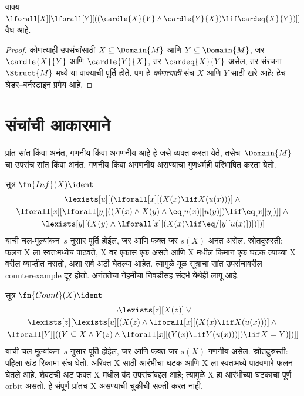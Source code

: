 \begin{prop}
वाक्य $\lforall[X][\lforall[Y][((\cardle{X}{Y} \land
    \cardle{Y}{X}) \lif \cardeq{X}{Y})]]$ वैध आहे.
\end{prop}

\begin{proof}
कोणत्याही उपसंचांसाठी $X \subseteq \Domain{M}$
आणि $Y \subseteq \Domain{M}$, जर
$\cardle{X}{Y}$ आणि $\cardle{Y}{X}$, तर
$\cardeq{X}{Y}$ असेल, तर संरचना~$\Struct{M}$
मध्ये या वाक्याची पूर्ति होते. पण हे
\emph{कोणत्याही} संच $X$ आणि $Y$ साठी खरे आहे:
हेच श्रेडर--बर्नस्टाइन प्रमेय आहे.
\end{proof}













\section{संचांची आकारमाने}\label{sol:set:crd:sec}

\begin{explain}
प्रांत सांत किंवा अनंत, गणनीय किंवा
अगणनीय आहे हे जसे व्यक्त करता येते,
तसेच~$\Domain{M}$ चा उपसंच सांत किंवा अनंत,
गणनीय किंवा अगणनीय असण्याचा
गुणधर्मही परिभाषित करता येतो.
\end{explain}

\begin{prop}

सूत्र $\fn{Inf}(X) \ident$
\begin{multline*}
\lexists[u][(\lforall[x][(X(x) \lif X(u(x)))] \land {} \\
\lforall[x][\lforall[y][((X(x) \land X(y) \land \eq[u(x)][u(y)]) \lif
      \eq[x][y])]] \land {} \\
\lexists[y][(X(y) \land \lforall[x][(X(x) \lif \eq/[y][u(x)])])])]
\end{multline*}
याची चल-मूल्यांकन~$s$ नुसार पूर्ति होईल, जर आणि
फक्त जर $s(X)$ अनंत असेल. स्रोतदुरुस्ती: फलन
X ला स्वतःमध्येच पाठवते, X वर एकास एक असते आणि X मधील
किमान एक घटक त्याच्या X वरील व्याप्तीत नसतो, अशा सर्व अटी
घेतल्या आहेत. त्यामुळे मूळ सूत्राचा सांत उपसंचावरील counterexample
दूर होतो. अनंततेचा नेहमीचा निवडीसह संदर्भ येथेही लागू आहे.
\end{prop}

\begin{prop}
सूत्र $\fn{Count}(X) \ident $
\begin{multline*}
\lnot\lexists[z][X(z)] \lor {} \\
\lexists[z][\lexists[u][(X(z) \land
    \lforall[x][(X(x) \lif X(u(x)))] \land {} \\
\lforall[Y][((Y \subseteq X \land Y(z) \land
      \lforall[x][(Y(x) \lif Y(u(x)))]) \lif X = Y)])]]
\end{multline*}
याची चल-मूल्यांकन~$s$ नुसार पूर्ति होईल, जर आणि
फक्त जर $s(X)$ गणनीय असेल. स्रोतदुरुस्ती:
पहिला खंड रिकामा संच घेतो. अरिक्त X साठी आरंभीचा घटक
आणि X ला स्वतःमध्ये पाठवणारे फलन घेतले आहे. शेवटची अट
फक्त X मधील बंद उपसंचांबद्दल आहे; त्यामुळे X हा आरंभीच्या
घटकाचा पूर्ण orbit असतो. हे संपूर्ण प्रांतच X असण्याची
चुकीची सक्ती करत नाही.
\end{prop}

